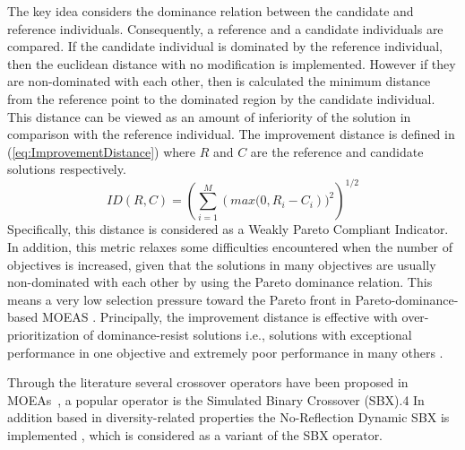 The key idea considers the dominance relation between the candidate and reference individuals. %
%
%
Consequently, a reference and a candidate individuals are compared.
%
If the candidate individual is dominated by the reference individual, then the euclidean distance with no modification is implemented.
%
However if they are non-dominated with each other, then is calculated the minimum distance from the reference point to the dominated region by the candidate individual. %
This distance can be viewed as an amount of inferiority of the solution in comparison with the reference individual.	
%
The improvement distance is defined in (\ref{eq:ImprovementDistance}) where $R$ and $C$ are the reference and candidate solutions respectively. 
\begin{equation} \label{eq:ImprovementDistance}
ID(R, C) = \left (\sum_{i=1}^M \left (max(0, R_i - C_i \right ))^2  \right)^{1/2}
\end{equation}
Specifically, this distance is considered as a Weakly Pareto Compliant Indicator.
%
In addition, this metric relaxes some difficulties encountered when the number of objectives is increased, given that the solutions in many objectives are usually non-dominated with each other by using the Pareto dominance relation.
%
This means a very low selection pressure toward the Pareto front in Pareto-dominance-based MOEAS \cite{Joel:Optimization_Of_Scalarizing_Functions_Through_Evolutionary_MOEAS}.
%
Principally, the improvement distance is effective with over-prioritization  of dominance-resist solutions i.e., solutions with exceptional performance in one objective and extremely poor performance in many others \cite{Joel:Failure_MOEAs}.
%


Through the literature several crossover operators have been proposed in MOEAs~\cite{Joel:ParentMeanCentricSelfAdaptation},  
a popular operator is the Simulated Binary Crossover (SBX).4\cite{Joel:SBX1994}%
%	
In addition based in diversity-related properties the No-Reflection Dynamic SBX is implemented \cite{Joel:DNR_SBX}, which is considered as a variant of the SBX operator.


